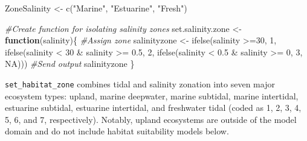 \documentclass[
]{book}
\newenvironment{Shaded}{\begin{snugshade}}{\end{snugshade}}
\newcommand{\CommentTok}[1]{\textcolor[rgb]{0.56,0.35,0.01}{\textit{#1}}}
\newcommand{\ConstantTok}[1]{\textcolor[rgb]{0.00,0.00,0.00}{#1}}
\newcommand{\ControlFlowTok}[1]{\textcolor[rgb]{0.13,0.29,0.53}{\textbf{#1}}}
\newcommand{\DecValTok}[1]{\textcolor[rgb]{0.00,0.00,0.81}{#1}}
\newcommand{\FloatTok}[1]{\textcolor[rgb]{0.00,0.00,0.81}{#1}}
\newcommand{\FunctionTok}[1]{\textcolor[rgb]{0.00,0.00,0.00}{#1}}
\newcommand{\NormalTok}[1]{#1}
\newcommand{\OtherTok}[1]{\textcolor[rgb]{0.56,0.35,0.01}{#1}}
\newcommand{\SpecialCharTok}[1]{\textcolor[rgb]{0.00,0.00,0.00}{#1}}
\newcommand{\StringTok}[1]{\textcolor[rgb]{0.31,0.60,0.02}{#1}}
\begin{document}
\begin{Shaded}
\begin{Highlighting}[]
\NormalTok{ZoneSalinity }\OtherTok{\textless{}{-}} \FunctionTok{c}\NormalTok{(}\StringTok{"Marine"}\NormalTok{, }\StringTok{"Estuarine"}\NormalTok{, }\StringTok{"Fresh"}\NormalTok{)}

\CommentTok{\#Create function for isolating salinity zones}
\NormalTok{set.salinity.zone }\OtherTok{\textless{}{-}} \ControlFlowTok{function}\NormalTok{(salinity)\{}
  \CommentTok{\#Assign zone}
\NormalTok{  salinityzone }\OtherTok{\textless{}{-}} \FunctionTok{ifelse}\NormalTok{(salinity }\SpecialCharTok{\textgreater{}=}\DecValTok{30}\NormalTok{, }\DecValTok{1}\NormalTok{, }
                  \FunctionTok{ifelse}\NormalTok{(salinity }\SpecialCharTok{\textless{}} \DecValTok{30} \SpecialCharTok{\&}\NormalTok{ salinity }\SpecialCharTok{\textgreater{}=} \FloatTok{0.5}\NormalTok{, }\DecValTok{2}\NormalTok{, }
                  \FunctionTok{ifelse}\NormalTok{(salinity }\SpecialCharTok{\textless{}} \FloatTok{0.5} \SpecialCharTok{\&}\NormalTok{ salinity }\SpecialCharTok{\textgreater{}=} \DecValTok{0}\NormalTok{, }\DecValTok{3}\NormalTok{, }\ConstantTok{NA}\NormalTok{)))}
  \CommentTok{\#Send output}
\NormalTok{  salinityzone}
\NormalTok{\}}
\end{Highlighting}
\end{Shaded}

\texttt{set\_habitat\_zone} combines tidal and salinity zonation into seven major ecosystem types: upland, marine deepwater, marine subtidal, marine intertidal, estuarine subtidal, estuarine intertidal, and freshwater tidal (coded as 1, 2, 3, 4, 5, 6, and 7, respectively). Notably, upland ecosystems are outside of the model domain and do not include habitat suitability models below.
\end{document}

